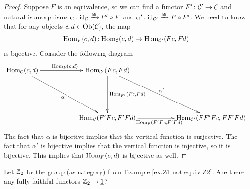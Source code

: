 \begin{proof}

Suppose $F$ is an equivalence, so we can find a functor $F'\colon\mathcal{C}'\rightarrow\mathcal{C}$ and natural isomorphisms $\alpha\colon\textnormal{id}_\mathcal{C}\xrightarrow{\cong}F'\circ F$ and $\alpha'\colon\textnormal{id}_{\mathcal{C}'}\xrightarrow{\cong} F\circ F'$. We need to know that for any objects $c,d\in\textnormal{Ob}(\mathcal{C})$, the map $$\textnormal{Hom}_F(c,d)\colon\textnormal{Hom}_\mathcal{C}(c,d)\rightarrow\textnormal{Hom}_{\mathcal{C}'}(Fc,Fd)$$ is bijective. Consider the following diagram 
$$
\xymatrix{
\Hom_\mcC(c,d)\ar[rr]^{\Hom_F(c,d)}\ar[ddrr]_\alpha&&\Hom_{\mcC'}(Fc,Fd)\ar[ddrr]^{\alpha'}\ar[dd]^{\Hom_{F'}(Fc,Fd)}\\\\
&&\Hom_\mcC(F'Fc,F'Fd)\ar[rr]_{\Hom_{F}(F'Fc,F'Fd)}&&\Hom_{\mcC'}(FF'Fc,FF'Fd)
}
$$
The fact that $\alpha$ is bijective implies that the vertical function is surjective. The fact that $\alpha'$ is bijective implies that the vertical function is injective, so it is bijective. This implies that $\textnormal{Hom}_F(c,d)$ is bijective as well.

\end{proof}

\begin{exercise}
Let ${\mathbb Z}_2$ be the group (as category) from Example \ref{ex:Z1 not equiv Z2}. Are there any fully faithful functors ${\mathbb Z}_2\rightarrow\underline{1}$?
\end{exercise}

